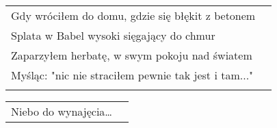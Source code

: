 \documentclass[a5paper]{article}
\begin{document}
\noindent
\begin{tabular}{@{}p{8.50cm}p{3cm}@{}}
Gdy wróciłem do domu, gdzie się błękit z betonem \\
Splata w Babel wysoki sięgający do chmur \\
Zaparzyłem herbatę, w swym pokoju nad światem \\
Myśląc: "nic nie straciłem pewnie tak jest i tam..." \\ \\
\end{tabular}

\noindent
\begin{tabular}{@{}p{7.50cm}p{3cm}@{}}
Niebo do wynajęcia…
\end{tabular}
\end{document}
